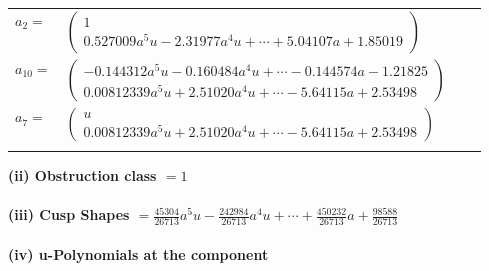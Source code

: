 \documentclass[1p]{elsarticle_modified}
\theoremstyle{definition}
\begin{document}
\begin{tabular}{m{7pt} m{180pt} m{7pt} m{180pt} }
\flushright $a_{2}=$&$\begin{pmatrix}1\\0.527009 a^{5} u-2.31977 a^{4} u+\cdots+5.04107 a+1.85019\end{pmatrix}$ \\
\flushright $a_{10}=$&$\begin{pmatrix}-0.144312 a^{5} u-0.160484 a^{4} u+\cdots-0.144574 a-1.21825\\0.00812339 a^{5} u+2.51020 a^{4} u+\cdots-5.64115 a+2.53498\end{pmatrix}$ \\
\flushright $a_{7}=$&$\begin{pmatrix}u\\0.00812339 a^{5} u+2.51020 a^{4} u+\cdots-5.64115 a+2.53498\end{pmatrix}$\\&\end{tabular}
\flushleft \textbf{(ii) Obstruction class $= 1$}\\~\\
\flushleft \textbf{(iii) Cusp Shapes $= \frac{45304}{26713} a^5 u-\frac{242984}{26713} a^4 u+\cdots+\frac{450232}{26713} a+\frac{98588}{26713}$}\\~\\
\newpage\renewcommand{\arraystretch}{1}
\flushleft \textbf{(iv) u-Polynomials at the component}\newline \\
\end{document}
